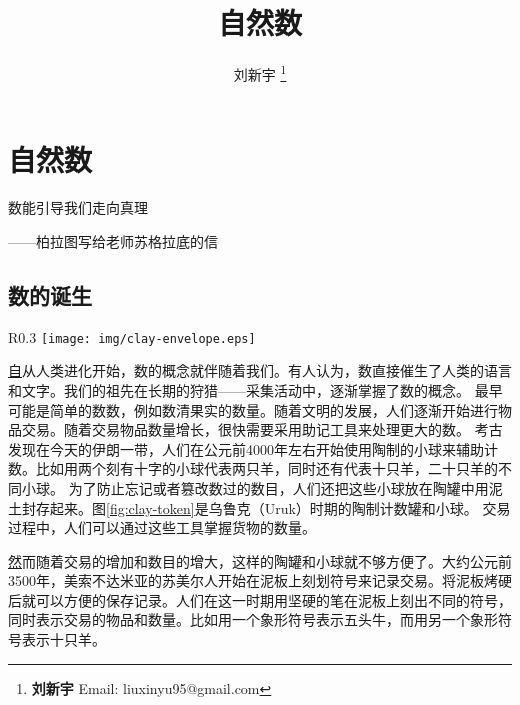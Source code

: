 \documentclass[UTF8]{article}
\begin{document}
\title{自然数}

\author{刘新宇
\thanks{{\bfseries 刘新宇} \newline
  Email: liuxinyu95@gmail.com \newline}
  }

\maketitle
\fi


\ifx\wholebook\relax
\chapter{自然数}
\fi

\epigraph{数能引导我们走向真理}{——柏拉图写给老师苏格拉底的信}

\section{数的诞生}

\begin{wrapfigure}{R}{0.3\textwidth}
 \centering
 \texttt{[image: img/clay-envelope.eps]}
 \caption{卢浮宫陈列的乌鲁尔时期的计数陶罐和一组计数陶球。}
 \label{fig:clay-token}
\end{wrapfigure}

\underline{自}从人类进化开始，数的概念就伴随着我们。有人认为，数直接催生了人类的语言和文字。我们的祖先在长期的狩猎——采集活动中，逐渐掌握了数的概念。
最早可能是简单的数数，例如数清果实的数量。随着文明的发展，人们逐渐开始进行物品交易。随着交易物品数量增长，很快需要采用助记工具来处理更大的数。
考古发现在今天的伊朗一带，人们在公元前4000年左右开始使用陶制的小球来辅助计数。比如用两个刻有十字的小球代表两只羊，同时还有代表十只羊，二十只羊的不同小球。
为了防止忘记或者篡改数过的数目，人们还把这些小球放在陶罐中用泥土封存起来。图\ref{fig:clay-token}是乌鲁克（Uruk）时期的陶制计数罐和小球\cite{wiki-number}。
交易过程中，人们可以通过这些工具掌握货物的数量\cite{trip-to-number-kindom}。

\underline{然}而随着交易的增加和数目的增大，这样的陶罐和小球就不够方便了。大约公元前3500年，美索不达米亚的苏美尔人开始在泥板上刻划符号来记录交易。将泥板烤硬后就可以方便的保存记录。人们在这一时期用坚硬的笔在泥板上刻出不同的符号，同时表示交易的物品和数量。比如用一个象形符号表示五头牛，而用另一个象形符号表示十只羊。
\end{document}
